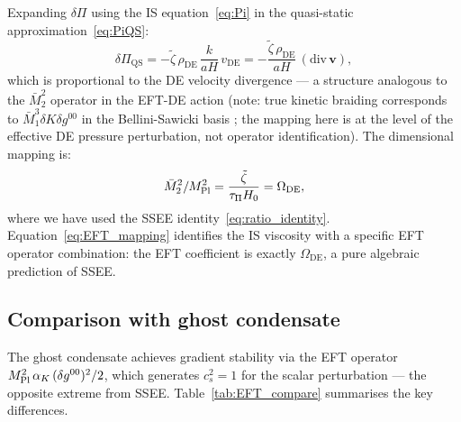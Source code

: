 \documentclass[12pt,a4paper]{article}
\newcommand{\OmDE}{\Omega_{\mathrm{DE}}}
\newcommand{\tauPi}{\tau_\Pi}
\newcommand{\ztilde}{\tilde{\zeta}}
\begin{document}
Expanding $\delta\Pi$ using the IS equation~\eqref{eq:Pi} in the quasi-static
approximation~\eqref{eq:PiQS}:
\begin{equation}
  \delta\Pi_{\mathrm{QS}} = -\ztilde\,\rho_{\mathrm{DE}}\,\frac{k}{aH}\,v_{\mathrm{DE}}
  = -\frac{\ztilde\,\rho_{\mathrm{DE}}}{aH}\,(\text{div}\,\mathbf{v}),
\end{equation}
which is proportional to the DE velocity divergence — a structure analogous to
the $\bar{M}_2^2$ operator in the EFT-DE action (note: true kinetic braiding
corresponds to $\bar{M}_1^3 \delta K \delta g^{00}$ in the Bellini-Sawicki
basis \citep{Bellini2015}; the mapping here is at the level of the effective
DE pressure perturbation, not operator identification).
The dimensional mapping is:
\begin{equation}
  \bar{M}_2^2/M_{\rm Pl}^2 = \frac{\ztilde}{\tauPi H_0} = \OmDE,
  \label{eq:EFT_mapping}
\end{equation}
where we have used the SSEE identity~\eqref{eq:ratio_identity}.
Equation~\eqref{eq:EFT_mapping} identifies the IS viscosity with a specific
EFT operator combination: the EFT coefficient is exactly $\OmDE$,
a pure algebraic prediction of SSEE.

\subsection{Comparison with ghost condensate}
\label{subsec:ghost}

The ghost condensate \citep{Arkani-Hamed2004} achieves gradient stability via
the EFT operator $M_{\rm Pl}^2\,\alpha_K\,(\delta g^{00})^2/2$, which generates
$c^2_s = 1$ for the scalar perturbation — the opposite extreme from SSEE.
Table~\ref{tab:EFT_compare} summarises the key differences.
\end{document}

